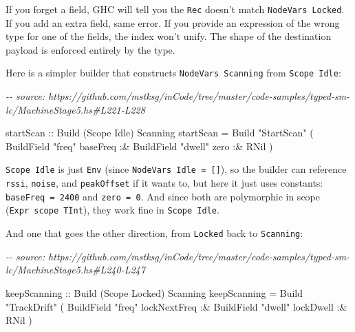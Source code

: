 \documentclass[]{article}
\newenvironment{Shaded}{}{}
\newcommand{\CommentTok}[1]{\textcolor[rgb]{0.38,0.63,0.69}{\textit{#1}}}
\newcommand{\DataTypeTok}[1]{\textcolor[rgb]{0.56,0.13,0.00}{#1}}
\newcommand{\NormalTok}[1]{#1}
\newcommand{\OperatorTok}[1]{\textcolor[rgb]{0.40,0.40,0.40}{#1}}
\newcommand{\OtherTok}[1]{\textcolor[rgb]{0.00,0.44,0.13}{#1}}
\newcommand{\StringTok}[1]{\textcolor[rgb]{0.25,0.44,0.63}{#1}}
\begin{document}
If you forget a field, GHC will tell you the \texttt{Rec} doesn't match
\texttt{NodeVars\ Locked}. If you add an extra field, same error. If you provide
an expression of the wrong type for one of the fields, the index won't unify.
The shape of the destination payload is enforced entirely by the type.

Here is a simpler builder that constructs \texttt{NodeVars\ Scanning} from
\texttt{Scope\ Idle}:

\begin{Shaded}
\begin{Highlighting}[]
\CommentTok{{-}{-} source: https://github.com/mstksg/inCode/tree/master/code{-}samples/typed{-}sm{-}lc/MachineStage5.hs\#L221{-}L228}

\OtherTok{startScan ::} \DataTypeTok{Build}\NormalTok{ (}\DataTypeTok{Scope} \DataTypeTok{Idle}\NormalTok{) }\DataTypeTok{Scanning}
\NormalTok{startScan }\OtherTok{=}
  \DataTypeTok{Build}
    \StringTok{"StartScan"}
\NormalTok{    ( }\DataTypeTok{BuildField} \StringTok{"freq"}\NormalTok{ baseFreq}
        \OperatorTok{:\&} \DataTypeTok{BuildField} \StringTok{"dwell"}\NormalTok{ zero}
        \OperatorTok{:\&} \DataTypeTok{RNil}
\NormalTok{    )}
\end{Highlighting}
\end{Shaded}

\texttt{Scope\ Idle} is just \texttt{Env} (since
\texttt{NodeVars\ Idle\ =\ {[}{]}}), so the builder can reference \texttt{rssi},
\texttt{noise}, and \texttt{peakOffset} if it wants to, but here it just uses
constants: \texttt{baseFreq\ =\ 2400} and \texttt{zero\ =\ 0}. And since both
are polymorphic in scope (\texttt{Expr\ scope\ TInt}), they work fine in
\texttt{Scope\ Idle}.

And one that goes the other direction, from \texttt{Locked} back to
\texttt{Scanning}:

\begin{Shaded}
\begin{Highlighting}[]
\CommentTok{{-}{-} source: https://github.com/mstksg/inCode/tree/master/code{-}samples/typed{-}sm{-}lc/MachineStage5.hs\#L240{-}L247}

\OtherTok{keepScanning ::} \DataTypeTok{Build}\NormalTok{ (}\DataTypeTok{Scope} \DataTypeTok{Locked}\NormalTok{) }\DataTypeTok{Scanning}
\NormalTok{keepScanning }\OtherTok{=}
  \DataTypeTok{Build}
    \StringTok{"TrackDrift"}
\NormalTok{    ( }\DataTypeTok{BuildField} \StringTok{"freq"}\NormalTok{ lockNextFreq}
        \OperatorTok{:\&} \DataTypeTok{BuildField} \StringTok{"dwell"}\NormalTok{ lockDwell}
        \OperatorTok{:\&} \DataTypeTok{RNil}
\NormalTok{    )}
\end{Highlighting}
\end{Shaded}
\end{document}
